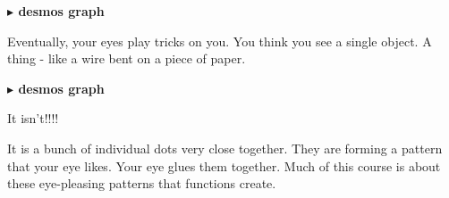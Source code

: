 \documentclass{ximera}
\begin{document}
\begin{onlineOnly}
\textbf{\textcolor{blue!55!black}{$\blacktriangleright$ desmos graph}} 
\begin{center}
\end{center}
\end{onlineOnly}



Eventually, your eyes play tricks on you.  You think you see a single object.  A thing - like a wire bent on a piece of paper.



\begin{image}
\end{image}






\begin{onlineOnly}
\textbf{\textcolor{blue!55!black}{$\blacktriangleright$ desmos graph}} 
\begin{center}
\end{center}
\end{onlineOnly}





\large{It isn't!!!!}




It is a bunch of individual dots very close together. They are forming a pattern that your eye likes. Your eye glues them together.  Much of this course is about these eye-pleasing patterns that functions create.
\end{document}
